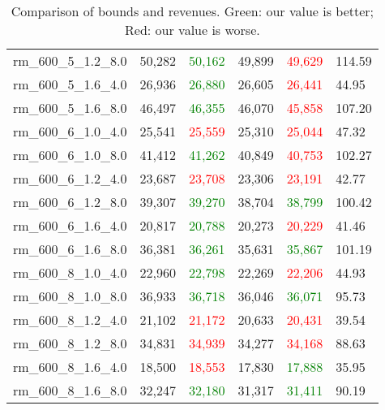 \documentclass[11pt]{article}
\begin{document}
\begin{table}[H]
\begin{tabular}{l|l|l|l|l|l}
rm\_600\_5\_1.2\_8.0 & 50,282 & \textcolor{green}{50,162} & 49,899 & \textcolor{red}{49,629} & 114.59 \\
rm\_600\_5\_1.6\_4.0 & 26,936 & \textcolor{green}{26,880} & 26,605 & \textcolor{red}{26,441} & 44.95 \\
rm\_600\_5\_1.6\_8.0 & 46,497 & \textcolor{green}{46,355} & 46,070 & \textcolor{red}{45,858} & 107.20 \\
rm\_600\_6\_1.0\_4.0 & 25,541 & \textcolor{red}{25,559} & 25,310 & \textcolor{red}{25,044} & 47.32 \\
rm\_600\_6\_1.0\_8.0 & 41,412 & \textcolor{green}{41,262} & 40,849 & \textcolor{red}{40,753} & 102.27 \\
rm\_600\_6\_1.2\_4.0 & 23,687 & \textcolor{red}{23,708} & 23,306 & \textcolor{red}{23,191} & 42.77 \\
rm\_600\_6\_1.2\_8.0 & 39,307 & \textcolor{green}{39,270} & 38,704 & \textcolor{green}{38,799} & 100.42 \\
rm\_600\_6\_1.6\_4.0 & 20,817 & \textcolor{green}{20,788} & 20,273 & \textcolor{red}{20,229} & 41.46 \\
rm\_600\_6\_1.6\_8.0 & 36,381 & \textcolor{green}{36,261} & 35,631 & \textcolor{green}{35,867} & 101.19 \\
rm\_600\_8\_1.0\_4.0 & 22,960 & \textcolor{green}{22,798} & 22,269 & \textcolor{red}{22,206} & 44.93 \\
rm\_600\_8\_1.0\_8.0 & 36,933 & \textcolor{green}{36,718} & 36,046 & \textcolor{green}{36,071} & 95.73 \\
rm\_600\_8\_1.2\_4.0 & 21,102 & \textcolor{red}{21,172} & 20,633 & \textcolor{red}{20,431} & 39.54 \\
rm\_600\_8\_1.2\_8.0 & 34,831 & \textcolor{red}{34,939} & 34,277 & \textcolor{red}{34,168} & 88.63 \\
rm\_600\_8\_1.6\_4.0 & 18,500 & \textcolor{red}{18,553} & 17,830 & \textcolor{green}{17,888} & 35.95 \\
rm\_600\_8\_1.6\_8.0 & 32,247 & \textcolor{green}{32,180} & 31,317 & \textcolor{green}{31,411} & 90.19 \\
\hline
\end{tabular}
\caption{Comparison of bounds and revenues. Green: our value is better; Red: our value is worse.}
\end{table}


\end{document}
